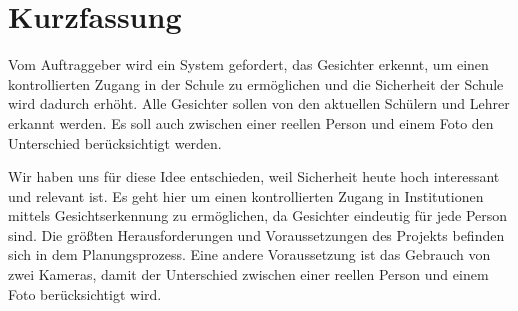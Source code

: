 \chapter*{Kurzfassung}

\begin{flushleft}
	Vom Auftraggeber wird ein System gefordert, das Gesichter erkennt, um einen kontrollierten Zugang in der Schule zu ermöglichen und die Sicherheit der Schule wird dadurch erhöht. Alle Gesichter sollen von den aktuellen Schülern und Lehrer erkannt werden. Es soll auch zwischen einer reellen Person und einem Foto den Unterschied berücksichtigt werden.
	
	Wir haben uns für diese Idee entschieden, weil Sicherheit heute hoch interessant und relevant ist. Es geht hier um einen kontrollierten Zugang in Institutionen mittels Gesichtserkennung zu ermöglichen, da Gesichter eindeutig für jede Person sind. Die größten Herausforderungen und Voraussetzungen des Projekts befinden sich in dem Planungsprozess. Eine andere Voraussetzung ist das Gebrauch von zwei Kameras, damit der Unterschied zwischen einer reellen Person und einem Foto berücksichtigt wird.
	
	
	
\end{flushleft}

\color{black} 
